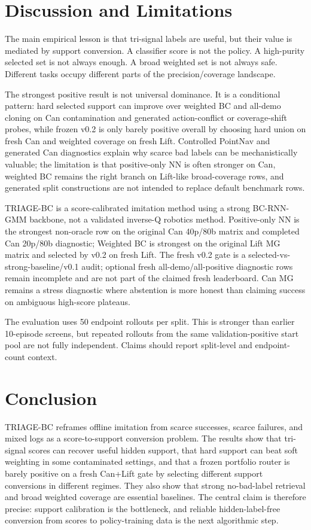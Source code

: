 \documentclass[11pt]{article}
\newcommand{\method}{TRIAGE-BC}
\begin{document}
\section{Discussion and Limitations}

The main empirical lesson is that tri-signal labels are useful, but their value is mediated by support conversion. A classifier score is not the policy. A high-purity selected set is not always enough. A broad weighted set is not always safe. Different tasks occupy different parts of the precision/coverage landscape.

The strongest positive result is not universal dominance. It is a conditional pattern: hard selected support can improve over weighted BC and all-demo cloning on Can contamination and generated action-conflict or coverage-shift probes, while frozen v0.2 is only barely positive overall by choosing hard union on fresh Can and weighted coverage on fresh Lift. Controlled PointNav and generated Can diagnostics explain why scarce bad labels can be mechanistically valuable; the limitation is that positive-only NN is often stronger on Can, weighted BC remains the right branch on Lift-like broad-coverage rows, and generated split constructions are not intended to replace default benchmark rows.

TRIAGE-BC is a score-calibrated imitation method using a strong BC-RNN-GMM backbone, not a validated inverse-Q robotics method. Positive-only NN is the strongest non-oracle row on the original Can 40p/80b matrix and completed Can 20p/80b diagnostic; Weighted BC is strongest on the original Lift MG matrix and selected by v0.2 on fresh Lift. The fresh v0.2 gate is a selected-vs-strong-baseline/v0.1 audit; optional fresh all-demo/all-positive diagnostic rows remain incomplete and are not part of the claimed fresh leaderboard. Can MG remains a stress diagnostic where abstention is more honest than claiming success on ambiguous high-score plateaus.

The evaluation uses 50 endpoint rollouts per split. This is stronger than earlier 10-episode screens, but repeated rollouts from the same validation-positive start pool are not fully independent. Claims should report split-level and endpoint-count context.

\section{Conclusion}

\method{} reframes offline imitation from scarce successes, scarce failures, and mixed logs as a score-to-support conversion problem. The results show that tri-signal scores can recover useful hidden support, that hard support can beat soft weighting in some contaminated settings, and that a frozen portfolio router is barely positive on a fresh Can+Lift gate by selecting different support conversions in different regimes. They also show that strong no-bad-label retrieval and broad weighted coverage are essential baselines. The central claim is therefore precise: support calibration is the bottleneck, and reliable hidden-label-free conversion from scores to policy-training data is the next algorithmic step.
\end{document}
